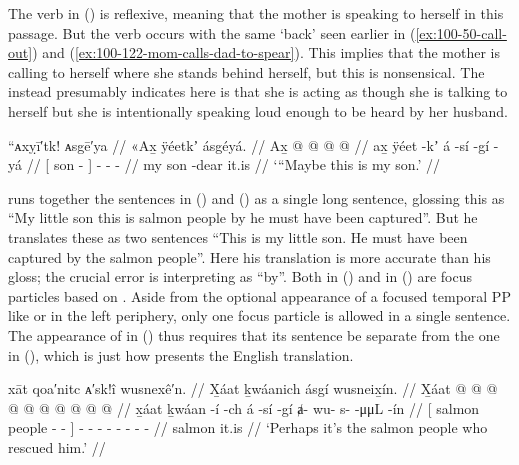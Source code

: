 The verb in (\lastx) is reflexive, meaning that the mother is speaking to herself in this passage.
But the verb occurs with the same  ‘back’ seen earlier in (\ref{ex:100-50-call-out}) and (\ref{ex:100-122-mom-calls-dad-to-spear}).
This implies that the mother is calling to herself where she stands behind herself, but this is nonsensical.
The  instead presumably indicates here is that she is acting as though she is talking to herself but she is intentionally speaking loud enough to be heard by her husband.

\ex\label{ex:100-134-maybe-my-son}%
%
\begingl
	\glpreamble	“ᴀxỵī′tk! ᴀsgē′ya //
	\glpreamble	«\!Ax̱ ÿéetkʼ ásgéyá. //
	\gla	{} Ax̱  @ {} {}  @ {} @ {} @ {} //
	\glb	{} ax̱ ÿéet -kʼ {} á -sí -gí -yá //
	\glc	{}[  son - {}]  - - - //
	\gld	{} my son -dear {} it.is  {} {} // 
	\glft	‘“Maybe this is my son.’
		//
\endgl
\xe

\citeauthor{swanton:1909} runs together the sentences in (\lastx) and (\nextx) as a single long sentence, glossing this as “My little son this is salmon people by he must have been captured”.
But he translates these as two sentences “This is my little son.
He must have been captured by the salmon people”.
Here his translation is more accurate than his gloss; the crucial error is interpreting  as “by”.
Both  in (\lastx) and  in (\nextx) are focus particles based on .
Aside from the optional appearance of a focused temporal PP like  or  in the left periphery, only one focus particle is allowed in a single sentence.
The appearance of  in (\nextx) thus requires that its sentence be separate from the one in (\lastx), which is just how \citeauthor{swanton:1909} presents the English translation.

\ex\label{ex:100-135-maybe-salmon-people-rescued}%
%
\begingl
	\glpreamble	xāt qoa′nitc ᴀ′sk!î wusnexê′n. //
	\glpreamble	X̱áat ḵwáanich ásgí wusneix̱ín. //
	\gla	{} X̱áat  @ {} @ {} {} 
		 @ {} @ {}
		 @ {} @ {} @ {} @ {} @ {} @ {} //
	\glb	{} x̱áat ḵwáan -í -ch {} 
		á -sí -gí 
		ⱥ- wu- s- {}  -μμL -ín //
	\glc	{}[ salmon people - - {}]
		 - -
		- - - -  - - //
	\gld	{} salmon  {} {} {}
		it.is  {}
		 {} {} {} {} {} {} {} //
	\glft	‘Perhaps it’s the salmon people who rescued him.’
		//
\endgl
\xe

